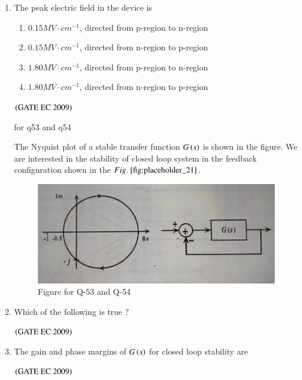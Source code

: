 \documentclass[journal,12pt,onecolumn]{IEEEtran}
\theoremstyle{remark}
\begin{document}
\begin{enumerate}[start=1, label={Q\arabic*.}]
\item The peak electric field in the device is
\begin{enumerate}
        \item $0.15 MV\cdot cm^{-1}$, directed from p-region to n-region
        \item $0.15 MV\cdot cm^{-1}$, directed from n-region to p-region
        \item $1.80  MV\cdot cm^{-1}$, directed from p-region to n-region
        \item $1.80 MV\cdot cm^{-1}$, directed from n-region to p-region
\end{enumerate}
\hfill $\left(\text{GATE EC 2009}\right)$

for q53 and q54

The Nyquist plot of a stable transfer function $G\left(s\right)$ is shown in the figure. We are interested in the stability of closed loop system in the feedback configuration shown in the $\figref{fig:placeholder_21}$. 
\begin{figure}[H]
    \centering
    \includegraphics[width=0.5\columnwidth]{figs/fig_22.jpg}
    \caption{\centering Figure for Q-53 and Q-54}
    \label{fig:placeholder_21}
\end{figure}

\item Which of the following is true ?
\begin{enumerate}
\end{enumerate}
\hfill $\left(\text{GATE EC 2009}\right)$

\item The gain and phase margins of $G\left(s\right)$ for closed loop stability are
\begin{enumerate}
\end{enumerate}
\hfill $\left(\text{GATE EC 2009}\right)$


\end{enumerate}
\end{document}
